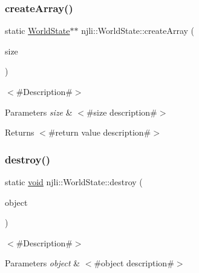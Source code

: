 \subsubsection{\texorpdfstring{create\+Array()}{createArray()}}
{\footnotesize\ttfamily static \mbox{\hyperlink{classnjli_1_1_world_state}{World\+State}}$\ast$$\ast$ njli\+::\+World\+State\+::create\+Array (\begin{DoxyParamCaption}\item[{const \mbox{\hyperlink{_util_8h_a10e94b422ef0c20dcdec20d31a1f5049}{u32}}}]{size }\end{DoxyParamCaption})\hspace{0.3cm}{\ttfamily [static]}}

$<$\#\+Description\#$>$


\begin{DoxyParams}{Parameters}
{\em size} & $<$\#size description\#$>$\\
\hline
\end{DoxyParams}
\begin{DoxyReturn}{Returns}
$<$\#return value description\#$>$ 
\end{DoxyReturn}
\mbox{\label{classnjli_1_1_world_state_a0dda0636635a1086b85a04bba007e6e2}} 
\subsubsection{\texorpdfstring{destroy()}{destroy()}}
{\footnotesize\ttfamily static \mbox{\hyperlink{_thread_8h_af1e856da2e658414cb2456cb6f7ebc66}{void}} njli\+::\+World\+State\+::destroy (\begin{DoxyParamCaption}\item[{\mbox{\hyperlink{classnjli_1_1_world_state}{World\+State}} $\ast$}]{object }\end{DoxyParamCaption})\hspace{0.3cm}{\ttfamily [static]}}

$<$\#\+Description\#$>$


\begin{DoxyParams}{Parameters}
{\em object} & $<$\#object description\#$>$ \\
\hline
\end{DoxyParams}
\mbox{\label{classnjli_1_1_world_state_ae8c65d0545df866ff59c6f197aa42707}} 
